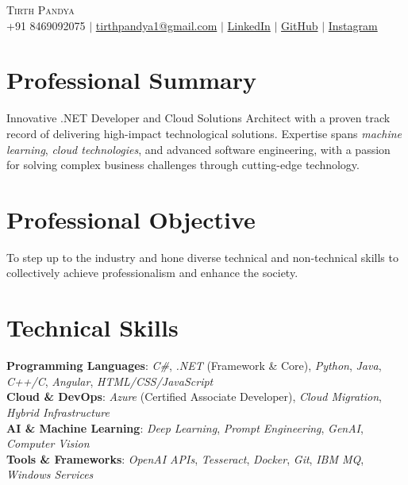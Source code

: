 \documentclass[letterpaper,11pt]{article}
\begin{document}
\begin{center}
    {\Huge \scshape Tirth Pandya} \\ \vspace{1pt}
    \small
    \faMobile \hspace{.5pt} +91 8469092075
    $|$
    \faEnvelope \hspace{.5pt} \href{mailto:tirthpandya1@gmail.com}{tirthpandya1@gmail.com}
    $|$
    \faLinkedin \hspace{.5pt} \href{https://www.linkedin.com/in/tirth-pandya-33b841143}{LinkedIn}
    $|$
    \faGithub \hspace{.5pt} \href{https://github.com/tirthpandya1}{GitHub}
    $|$
    \faInstagram \hspace{.5pt} \href{https://www.instagram.com/tirth_6}{Instagram}
\end{center}

\section{Professional Summary}
Innovative .NET Developer and Cloud Solutions Architect with a proven track record of delivering high-impact technological solutions. Expertise spans \textit{machine learning}, \textit{cloud technologies}, and advanced software engineering, with a passion for solving complex business challenges through cutting-edge technology.

\section{Professional Objective}
To step up to the industry and hone diverse technical and non-technical skills to collectively achieve professionalism and enhance the society.

\section{Technical Skills}
\begin{itemize}[leftmargin=0.15in, label={}]
    \small{\item{
        \textbf{Programming Languages}{: \textit{C\#}, \textit{.NET} (Framework \& Core), \textit{Python}, \textit{Java}, \textit{C++/C}, \textit{Angular}, \textit{HTML/CSS/JavaScript}} \\
        \textbf{Cloud \& DevOps}{: \textit{Azure} (Certified Associate Developer), \textit{Cloud Migration}, \textit{Hybrid Infrastructure}} \\
        \textbf{AI \& Machine Learning}{: \textit{Deep Learning}, \textit{Prompt Engineering}, \textit{GenAI}, \textit{Computer Vision}} \\
        \textbf{Tools \& Frameworks}{: \textit{OpenAI APIs}, \textit{Tesseract}, \textit{Docker}, \textit{Git}, \textit{IBM MQ}, \textit{Windows Services}}
    }}
\end{itemize}
\end{document}
